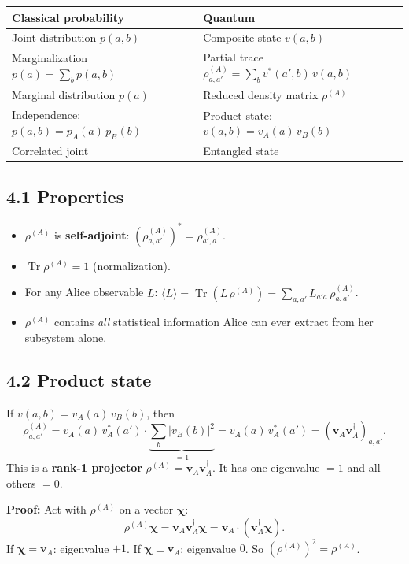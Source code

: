 \documentclass[12pt,a4paper]{article}
\begin{document}
\medskip
\begin{center}
\begin{tabular}{l|l}
\textbf{Classical probability} & \textbf{Quantum} \\ \hline
Joint distribution $p(a,b)$ & Composite state $v(a,b)$ \\
Marginalization $p(a)=\sum_b p(a,b)$ & Partial trace $\rho^{(A)}_{a,a'}=\sum_b v^*(a',b)\,v(a,b)$ \\
Marginal distribution $p(a)$ & Reduced density matrix $\rho^{(A)}$ \\
Independence: $p(a,b)=p_A(a)\,p_B(b)$ & Product state: $v(a,b)=v_A(a)\,v_B(b)$ \\
Correlated joint & Entangled state
\end{tabular}
\end{center}

\subsection{4.1 Properties}
\begin{itemize}[nosep]
    \item $\rho^{(A)}$ is \textbf{self-adjoint}: $(\rho^{(A)}_{a,a'})^* = \rho^{(A)}_{a',a}$.
    \item $\operatorname{Tr}\rho^{(A)}=1$ (normalization).
    \item For any Alice observable $L$: $\langle L \rangle = \operatorname{Tr}(L\,\rho^{(A)}) = \sum_{a,a'} L_{a'a}\,\rho^{(A)}_{a,a'}$.
    \item $\rho^{(A)}$ contains \emph{all} statistical information Alice can ever extract from her subsystem alone.
\end{itemize}

\subsection{4.2 Product state}
If $v(a,b)=v_A(a)\,v_B(b)$, then
\[
    \rho^{(A)}_{a,a'} = v_A(a)\,v_A^*(a') \cdot \underbrace{\sum_b |v_B(b)|^2}_{=1} = v_A(a)\,v_A^*(a') = (\mathbf{v}_A\mathbf{v}_A^\dagger)_{a,a'}.
\]
This is a \textbf{rank-1 projector} $\rho^{(A)} = \mathbf{v}_A\mathbf{v}_A^\dagger$.  It has one eigenvalue $=1$ and all others $=0$.

\noindent\textbf{Proof:} Act with $\rho^{(A)}$ on a vector $\boldsymbol{\chi}$:
\[
    \rho^{(A)}\boldsymbol{\chi} = \mathbf{v}_A\mathbf{v}_A^\dagger\boldsymbol{\chi} = \mathbf{v}_A\cdot(\mathbf{v}_A^\dagger\boldsymbol{\chi}).
\]
If $\boldsymbol{\chi}=\mathbf{v}_A$: eigenvalue $+1$.  If $\boldsymbol{\chi}\perp\mathbf{v}_A$: eigenvalue $0$.  So $(\rho^{(A)})^2 = \rho^{(A)}$.
\end{document}
